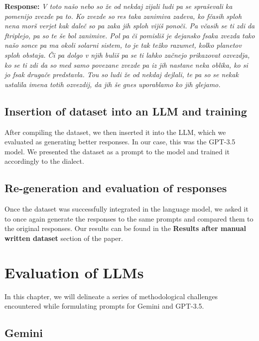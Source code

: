 \documentclass[fleqn,moreauthors,10pt]{ds_report}
\begin{document}
\textbf{Response:}
\textit{V toto našo nebo so že od nekdaj zijali ludi pa se spraševali ka pomenijo zvezde pa to. Ko zvezde so res taka zanimiva zadeva, ko fčasih sploh nena morš verjet kak daleč so pa zaka jih sploh vijiš ponoči. Pa včasih se ti zdi da ftriplejo, pa so te še bol zanimive. Pol pa či pomisliš je dejansko fsaka zvezda tako našo sonce pa ma okoli solarni sistem, to je tak težko razumet, kolko planetov sploh obstaja.}
\textit{Či pa dolgo v njih buliš pa se ti lahko začnejo prikazovat ozvezdja, ko se ti zdi da so med samo povezane zvezde pa iz jih nastane neka oblika, ko si jo fsak drugače predstavla. Tou so ludi že od nekdaj dejlali, te pa so se nekak ustalila imena totih ozvezdij, da jih še gnes uporablamo ko jih glejamo.}

\subsection{Insertion of dataset into an LLM and training}

After compiling the dataset, we then inserted it into the LLM, which we evaluated as generating better responses. In our case, this was the GPT-3.5 model. We presented the dataset as a prompt to the model and trained it accordingly to the dialect.

\subsection{Re-generation and evaluation of responses}

Once the dataset was successfully integrated in the language model, we asked it to once again generate the responses to the same prompts and compared them to the original responses. Our results can be found in the \textbf{Results after manual written dataset} section of the paper.


 


\section{Evaluation of LLMs}

    In this chapter, we will delineate a series of methodological challenges encountered while formulating prompts for Gemini and GPT-3.5.

\subsection{Gemini}
\end{document}
